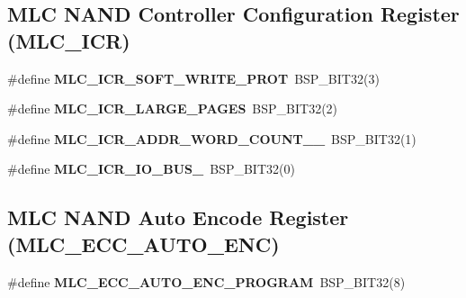 \subsection*{M\+LC N\+A\+ND Controller Configuration Register (M\+L\+C\+\_\+\+I\+CR)}
\begin{DoxyCompactItemize}
\item 
\mbox{\label{group__lpc32xx__nand__mlc_gafa184d51565e7c117c4bb76e2e0f410a}} 
\#define {\bfseries M\+L\+C\+\_\+\+I\+C\+R\+\_\+\+S\+O\+F\+T\+\_\+\+W\+R\+I\+T\+E\+\_\+\+P\+R\+OT}~B\+S\+P\+\_\+\+B\+I\+T32(3)
\item 
\mbox{\label{group__lpc32xx__nand__mlc_ga8b587f5392d598f73f1e641fac585005}} 
\#define {\bfseries M\+L\+C\+\_\+\+I\+C\+R\+\_\+\+L\+A\+R\+G\+E\+\_\+\+P\+A\+G\+ES}~B\+S\+P\+\_\+\+B\+I\+T32(2)
\item 
\mbox{\label{group__lpc32xx__nand__mlc_ga048cb9942a727a7eca746345c55f1f22}} 
\#define {\bfseries M\+L\+C\+\_\+\+I\+C\+R\+\_\+\+A\+D\+D\+R\+\_\+\+W\+O\+R\+D\+\_\+\+C\+O\+U\+N\+T\+\_\+\_}~B\+S\+P\+\_\+\+B\+I\+T32(1)
\item 
\mbox{\label{group__lpc32xx__nand__mlc_ga1e5d95b667f3305b72564df294498d70}} 
\#define {\bfseries M\+L\+C\+\_\+\+I\+C\+R\+\_\+\+I\+O\+\_\+\+B\+U\+S\+\_}~B\+S\+P\+\_\+\+B\+I\+T32(0)
\end{DoxyCompactItemize}
\subsection*{M\+LC N\+A\+ND Auto Encode Register (M\+L\+C\+\_\+\+E\+C\+C\+\_\+\+A\+U\+T\+O\+\_\+\+E\+NC)}
\begin{DoxyCompactItemize}
\item 
\mbox{\label{group__lpc32xx__nand__mlc_gae0285eaa1a112e3e7b438488c41e76cb}} 
\#define {\bfseries M\+L\+C\+\_\+\+E\+C\+C\+\_\+\+A\+U\+T\+O\+\_\+\+E\+N\+C\+\_\+\+P\+R\+O\+G\+R\+AM}~B\+S\+P\+\_\+\+B\+I\+T32(8)
\end{DoxyCompactItemize}
